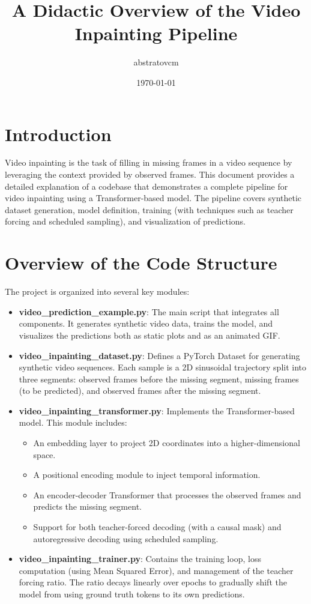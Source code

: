 \documentclass{article}
\title{A Didactic Overview of the Video Inpainting Pipeline}
\author{abstratovcm}
\date{\today}
\begin{document}
\maketitle

\section{Introduction}
Video inpainting is the task of filling in missing frames in a video sequence by leveraging the context provided by observed frames. This document provides a detailed explanation of a codebase that demonstrates a complete pipeline for video inpainting using a Transformer-based model. The pipeline covers synthetic dataset generation, model definition, training (with techniques such as teacher forcing and scheduled sampling), and visualization of predictions.

\section{Overview of the Code Structure}
The project is organized into several key modules:
\begin{itemize}
    \item \textbf{video\_prediction\_example.py}: The main script that integrates all components. It generates synthetic video data, trains the model, and visualizes the predictions both as static plots and as an animated GIF.
    \item \textbf{video\_inpainting\_dataset.py}: Defines a PyTorch Dataset for generating synthetic video sequences. Each sample is a 2D sinusoidal trajectory split into three segments: observed frames before the missing segment, missing frames (to be predicted), and observed frames after the missing segment.
    \item \textbf{video\_inpainting\_transformer.py}: Implements the Transformer-based model. This module includes:
    \begin{itemize}
        \item An embedding layer to project 2D coordinates into a higher-dimensional space.
        \item A positional encoding module to inject temporal information.
        \item An encoder-decoder Transformer that processes the observed frames and predicts the missing segment.
        \item Support for both teacher-forced decoding (with a causal mask) and autoregressive decoding using scheduled sampling.
    \end{itemize}
    \item \textbf{video\_inpainting\_trainer.py}: Contains the training loop, loss computation (using Mean Squared Error), and management of the teacher forcing ratio. The ratio decays linearly over epochs to gradually shift the model from using ground truth tokens to its own predictions.
\end{itemize}
\end{document}
